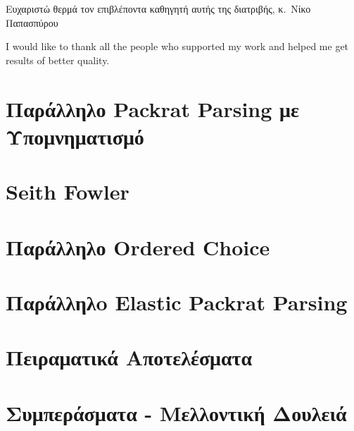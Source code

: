 \documentclass[diploma]{softlab-thesis}
\begin{document}

\begin{acknowledgementsgr}
  Ευχαριστώ θερμά τον επιβλέποντα καθηγητή αυτής της διατριβής,
  κ.~Νίκο Παπασπύρου
\end{acknowledgementsgr}

\begin{acknowledgementsen}
  I would like to thank all the people who supported my work and helped me get
  results of better quality.  
\end{acknowledgementsen}



\tableofcontents
\listoffigures


\mainmatter













\chapter{ Παράλληλο Packrat Parsing με Υπομνηματισμό }

\chapter{ Seith Fowler}

\chapter{ Παράλληλο Ordered Choice }

\chapter{ Παράλληλo Elastic Packrat Parsing }

\chapter{ Πειραματικά Αποτελέσματα }

\chapter{ Συμπεράσματα - Μελλοντική Δουλειά }
\end{document}
